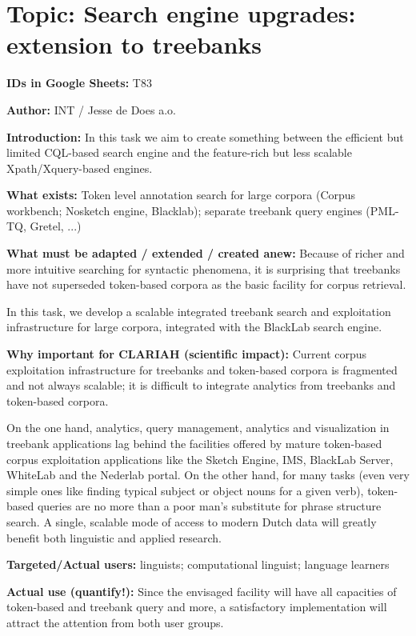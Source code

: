 \section{Topic: Search engine upgrades: extension to
treebanks}\label{topic-search-engine-upgrades-extension-to-treebanks}

\textbf{IDs in Google Sheets:} T83

\textbf{Author:} INT / Jesse de Does a.o.

\textbf{Introduction:} In this task we aim to create something between
the efficient but limited CQL-based search engine and the feature-rich
but less scalable Xpath/Xquery-based engines.

\textbf{What exists:} Token level annotation search for large corpora
(Corpus workbench; Nosketch engine, Blacklab); separate treebank query
engines (PML-TQ, Gretel, ...)

\textbf{What must be adapted / extended / created anew:} Because of
richer and more intuitive searching for syntactic phenomena, it is
surprising that treebanks have not superseded token-based corpora as the
basic facility for corpus retrieval.

In this task, we develop a scalable integrated treebank search and
exploitation infrastructure for large corpora, integrated with the
BlackLab search engine.

\textbf{Why important for CLARIAH (scientific impact):} Current corpus
exploitation infrastructure for treebanks and token-based corpora is
fragmented and not always scalable; it is difficult to integrate
analytics from treebanks and token-based corpora.

On the one hand, analytics, query management, analytics and
visualization in treebank applications lag behind the facilities offered
by mature token-based corpus exploitation applications like the Sketch
Engine, IMS, BlackLab Server, WhiteLab and the Nederlab portal. On the
other hand, for many tasks (even very simple ones like finding typical
subject or object nouns for a given verb), token-based queries are no
more than a poor man's substitute for phrase structure search. A single,
scalable mode of access to modern Dutch data will greatly benefit both
linguistic and applied research.

\textbf{Targeted/Actual users:} linguists; computational linguist;
language learners

\textbf{Actual use (quantify!):} Since the envisaged facility will have
all capacities of token-based and treebank query and more, a
satisfactory implementation will attract the attention from both user
groups.


